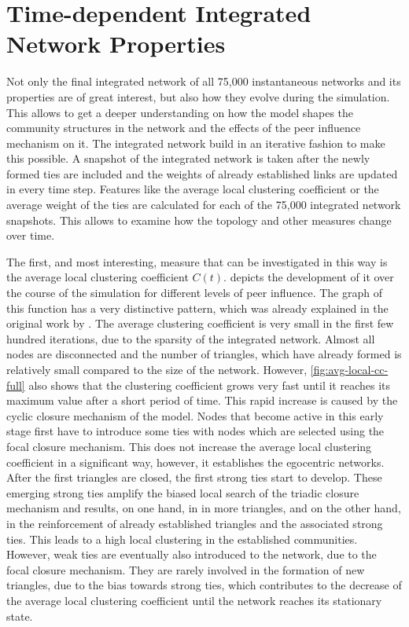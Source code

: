 

\section{Time-dependent Integrated Network Properties}
\label{sec:integrated-network-properties}

Not only the final integrated network of all 75,000 instantaneous networks and its properties are of great interest, but also how they evolve during the simulation.
This allows to get a deeper understanding on how the model shapes the community structures in the network and the effects of the peer influence mechanism on it.
The integrated network build in an iterative fashion to make this possible.
A snapshot of the integrated network is taken after the newly formed ties are included and the weights of already established links are updated in every time step.
Features like the average local clustering coefficient or the average weight of the ties are calculated for each of the 75,000 integrated network snapshots.
This allows to examine how the topology and other measures change over time.

The first, and most interesting, measure that can be investigated in this way is the average local clustering coefficient \( C(t) \).
 depicts the development of it over the course of the simulation for different levels of peer influence.
The graph of this function has a very distinctive pattern, which was already explained in the original work by \citet{Laurent2015}.
The average clustering coefficient is very small in the first few hundred iterations, due to the sparsity of the integrated network.
Almost all nodes are disconnected and the number of triangles, which have already formed is relatively small compared to the size of the network.
However, \cref{fig:avg-local-cc-full} also shows that the clustering coefficient grows very fast until it reaches its maximum value after a short period of time.
This rapid increase is caused by the cyclic closure mechanism of the model.
Nodes that become active in this early stage first have to introduce some ties with nodes which are selected using the focal closure mechanism.
This does not increase the average local clustering coefficient in a significant way, however, it establishes the egocentric networks.
After the first triangles are closed, the first strong ties start to develop.
These emerging strong ties amplify the biased local search of the triadic closure mechanism and results, on one hand, in in more triangles, and on the other hand, in the reinforcement of already established triangles and the associated strong ties.
This leads to a high local clustering in the established communities.
However, weak ties are eventually also introduced to the network, due to the focal closure mechanism.
They are rarely involved in the formation of new triangles, due to the bias towards strong ties, which contributes to the decrease of the average local clustering coefficient until the network reaches its stationary state.


